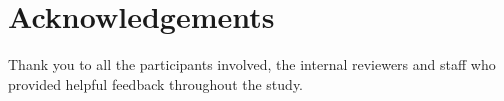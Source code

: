 \documentclass{scaffold/sigchi}
\begin{document}
\section{Acknowledgements}
Thank you to all the participants involved, the internal reviewers and staff who provided helpful feedback throughout the study.

\balance{}





\end{document}
